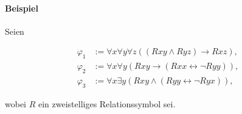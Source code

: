 \documentclass[
    ngerman,
    color=3b,
    summary,
    boxarc,
    main,
    fleqn,
    leqno,
]{rubos-tuda-template}
\begin{document}
    \paragraph{Beispiel}\mbox{}

    Seien
    \begin{ceqn}
        \begin{align*}
            \varphi_1 & := \forall x\forall y\forall z ((Rxy \land Ryz) \rightarrow{} Rxz),         \\
            \varphi_2 & := \forall x \forall y (Rxy \rightarrow{} (Rxx \leftrightarrow \lnot Ryy)), \\
            \varphi_3 & := \forall x \exists y ( Rxy \land (Ryy \leftrightarrow \lnot Ryx)),
        \end{align*}
    \end{ceqn}
    wobei $R$ ein zweistelliges Relationssymbol sei.
\end{document}
